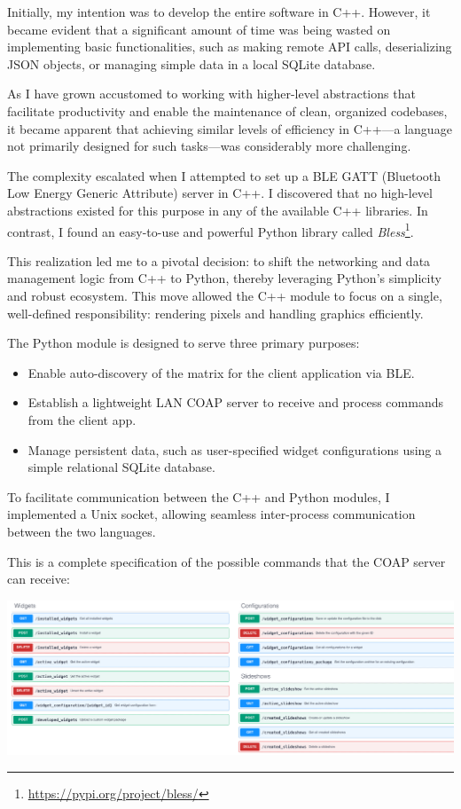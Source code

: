 Initially, my intention was to develop the entire software in C++. However, it became evident that a significant amount of time was being wasted on implementing basic functionalities, such as making remote API calls, deserializing JSON objects, or managing simple data in a local SQLite database.

As I have grown accustomed to working with higher-level abstractions that facilitate productivity and enable the maintenance of clean, organized codebases, it became apparent that achieving similar levels of efficiency in C++—a language not primarily designed for such tasks—was considerably more challenging. 

The complexity escalated when I attempted to set up a BLE GATT (Bluetooth Low Energy Generic Attribute) server in C++. I discovered that no high-level abstractions existed for this purpose in any of the available C++ libraries. In contrast, I found an easy-to-use and powerful Python library called \textit{Bless}\footnote{\url{https://pypi.org/project/bless/}}.

This realization led me to a pivotal decision: to shift the networking and data management logic from C++ to Python, thereby leveraging Python's simplicity and robust ecosystem. This move allowed the C++ module to focus on a single, well-defined responsibility: rendering pixels and handling graphics efficiently.

The Python module is designed to serve three primary purposes:
\begin{itemize}
    \item Enable auto-discovery of the matrix for the client application via BLE.
    \item Establish a lightweight LAN COAP server to receive and process commands from the client app.
    \item Manage persistent data, such as user-specified widget configurations using a simple relational SQLite database.
\end{itemize}

\newpage
To facilitate communication between the C++ and Python modules, I implemented a Unix socket, allowing seamless inter-process communication between the two languages.

This is a complete specification of the possible commands that the COAP server can receive:

\includegraphics[width=1\textwidth]{tesi/img/coap-swagger.png}

